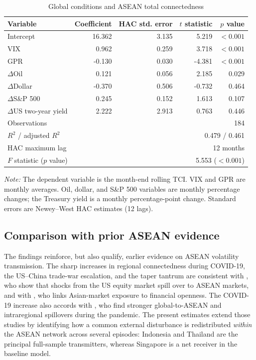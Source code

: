\documentclass[12pt,a4paper]{article}
\begin{document}
\begin{table}[H]
\centering
\caption{Global conditions and ASEAN total connectedness}
\label{tab:hac}
\begin{tabular}{lrrrr}
\toprule
Variable & Coefficient & HAC std. error & $t$ statistic & $p$ value \\
\midrule
Intercept & 16.362 & 3.135 & 5.219 & $<0.001$ \\
VIX & 0.962 & 0.259 & 3.718 & $<0.001$ \\
GPR & -0.130 & 0.030 & -4.381 & $<0.001$ \\
$\Delta$Oil & 0.121 & 0.056 & 2.185 & 0.029 \\
$\Delta$Dollar & -0.370 & 0.506 & -0.732 & 0.464 \\
$\Delta$S\&P 500 & 0.245 & 0.152 & 1.613 & 0.107 \\
$\Delta$US two-year yield & 2.222 & 2.913 & 0.763 & 0.446 \\
\midrule
Observations & \multicolumn{4}{r}{184} \\
$R^2$ / adjusted $R^2$ & \multicolumn{4}{r}{0.479 / 0.461} \\
HAC maximum lag & \multicolumn{4}{r}{12 months} \\
$F$ statistic ($p$ value) & \multicolumn{4}{r}{5.553 ($<0.001$)} \\
\bottomrule
\end{tabular}
\begin{minipage}{0.90\textwidth}
\footnotesize\textit{Note:} The dependent variable is the month-end rolling TCI. VIX and GPR are monthly averages. Oil, dollar, and S\&P 500 variables are monthly percentage changes; the Treasury yield is a monthly percentage-point change. Standard errors are Newey--West HAC estimates (12 lags).
\end{minipage}
\end{table}

\subsection{Comparison with prior ASEAN evidence}

The findings reinforce, but also qualify, earlier evidence on ASEAN volatility transmission. The sharp increases in regional connectedness during COVID-19, the US--China trade-war escalation, and the taper tantrum are consistent with \citet{VoTran2020}, who show that shocks from the US equity market spill over to ASEAN markets, and with \citet{Chow2017}, who links Asian-market exposure to financial openness. The COVID-19 increase also accords with \citet{SethapramoteEtAl2023}, who find stronger global-to-ASEAN and intraregional spillovers during the pandemic. The present estimates extend those studies by identifying how a common external disturbance is redistributed \emph{within} the ASEAN network across several episodes: Indonesia and Thailand are the principal full-sample transmitters, whereas Singapore is a net receiver in the baseline model.
\end{document}
